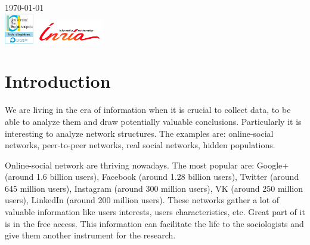 \documentclass[12pt]{report}
\begin{document}
\begin{titlepage}

{\large \today}\\[1cm] %


\includegraphics[height=50px]{univer} \qquad\qquad
\includegraphics[height=40px]{inria}\\[1cm] 
 

\vfill %

\end{titlepage}

\tableofcontents

\chapter*{Introduction}

We are living in the era of information when it is crucial to collect data, to be able to analyze them and draw potentially valuable conclusions. Particularly it is interesting to analyze network structures. The examples are: online-social networks, peer-to-peer networks, real social networks, hidden populations.

Online-social network are thriving nowadays. The most popular are: Google+ (around 1.6 billion users), Facebook (around 1.28 billion users), Twitter (around 645 million users), Instagram (around 300 million users), VK (around 250 million users), LinkedIn (around 200 million users). These networks gather a lot of valuable information like users interests, users characteristics, etc. Great part of it is in the free access. This information can facilitate the life to the sociologists and give them another instrument for the research.
\end{document}
